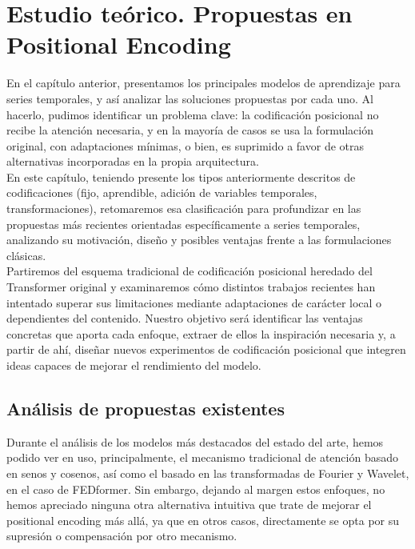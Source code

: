 \chapter{Estudio teórico. Propuestas en Positional Encoding}

En el capítulo anterior, presentamos los principales modelos de aprendizaje para series temporales, y así analizar las soluciones propuestas por cada uno. Al hacerlo, pudimos identificar un problema clave: la codificación posicional no recibe la atención necesaria, y en la mayoría de casos se usa la formulación original, con adaptaciones mínimas, o bien, es suprimido a favor de otras alternativas incorporadas en la propia arquitectura.\\

En este capítulo, teniendo presente los tipos anteriormente descritos de codificaciones (fijo, aprendible, adición de variables temporales, transformaciones), retomaremos esa clasificación para profundizar en las propuestas más recientes orientadas específicamente a series temporales, analizando su motivación, diseño y posibles ventajas frente a las formulaciones clásicas.\\

Partiremos del esquema tradicional de codificación posicional heredado del Transformer original y examinaremos cómo distintos trabajos recientes han intentado superar sus limitaciones mediante adaptaciones de carácter local o dependientes del contenido. Nuestro objetivo será identificar las ventajas concretas que aporta cada enfoque, extraer de ellos la inspiración necesaria y, a partir de ahí, diseñar nuevos experimentos de codificación posicional que integren ideas capaces de mejorar el rendimiento del modelo.

\section{Análisis de propuestas existentes}

Durante el análisis de los modelos más destacados del estado del arte, hemos podido ver en uso, principalmente, el mecanismo tradicional de atención basado en senos y cosenos, así como el basado en las transformadas de Fourier y Wavelet, en el caso de FEDformer. Sin embargo, dejando al margen estos enfoques, no hemos apreciado ninguna otra alternativa intuitiva que trate de mejorar el positional encoding más allá, ya que en otros casos, directamente se opta por su supresión o compensación por otro mecanismo.\\

